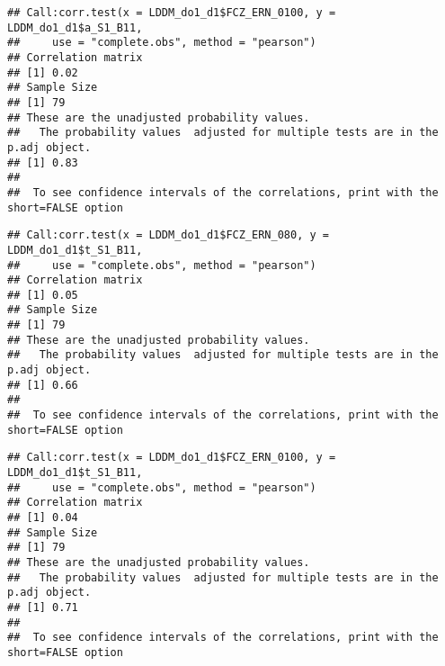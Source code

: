 \documentclass[
]{article}
\newenvironment{Shaded}{\begin{snugshade}}{\end{snugshade}}
\newcommand{\AttributeTok}[1]{\textcolor[rgb]{0.77,0.63,0.00}{#1}}
\newcommand{\FunctionTok}[1]{\textcolor[rgb]{0.00,0.00,0.00}{#1}}
\newcommand{\NormalTok}[1]{#1}
\newcommand{\SpecialCharTok}[1]{\textcolor[rgb]{0.00,0.00,0.00}{#1}}
\newcommand{\StringTok}[1]{\textcolor[rgb]{0.31,0.60,0.02}{#1}}
\begin{document}
\begin{verbatim}
## Call:corr.test(x = LDDM_do1_d1$FCZ_ERN_0100, y = LDDM_do1_d1$a_S1_B11, 
##     use = "complete.obs", method = "pearson")
## Correlation matrix 
## [1] 0.02
## Sample Size 
## [1] 79
## These are the unadjusted probability values.
##   The probability values  adjusted for multiple tests are in the p.adj object. 
## [1] 0.83
## 
##  To see confidence intervals of the correlations, print with the short=FALSE option
\end{verbatim}

\begin{Shaded}
\end{Shaded}

\begin{verbatim}
## Call:corr.test(x = LDDM_do1_d1$FCZ_ERN_080, y = LDDM_do1_d1$t_S1_B11, 
##     use = "complete.obs", method = "pearson")
## Correlation matrix 
## [1] 0.05
## Sample Size 
## [1] 79
## These are the unadjusted probability values.
##   The probability values  adjusted for multiple tests are in the p.adj object. 
## [1] 0.66
## 
##  To see confidence intervals of the correlations, print with the short=FALSE option
\end{verbatim}

\begin{Shaded}
\end{Shaded}

\begin{verbatim}
## Call:corr.test(x = LDDM_do1_d1$FCZ_ERN_0100, y = LDDM_do1_d1$t_S1_B11, 
##     use = "complete.obs", method = "pearson")
## Correlation matrix 
## [1] 0.04
## Sample Size 
## [1] 79
## These are the unadjusted probability values.
##   The probability values  adjusted for multiple tests are in the p.adj object. 
## [1] 0.71
## 
##  To see confidence intervals of the correlations, print with the short=FALSE option
\end{verbatim}
\end{document}
